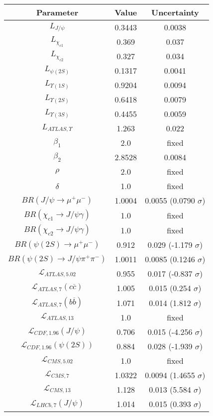 \begin{table}[h!]
\centering
\begin{tabular}{c|c|c}
Parameter & Value & Uncertainty \\
\hline
$L_{J/\psi}$ & 0.3443 & 0.0038 \\
$L_{\chi_{c1}}$ & 0.369 & 0.037 \\
$L_{\chi_{c2}}$ & 0.327 & 0.034 \\
$L_{\psi(2S)}$ & 0.1317 & 0.0041 \\
$L_{\Upsilon(1S)}$ & 0.9204 & 0.0094 \\
$L_{\Upsilon(2S)}$ & 0.6418 & 0.0079 \\
$L_{\Upsilon(3S)}$ & 0.4455 & 0.0059 \\
$L_{ATLAS,\Upsilon}$ & 1.263 & 0.022 \\
$\beta_1$ & 2.0 & fixed \\
$\beta_2$ & 2.8528 & 0.0084 \\
$\rho$ & 2.0 & fixed \\
$\delta$ & 1.0 & fixed \\
$BR(J/\psi\rightarrow\mu^+\mu^-)$ & 1.0004 & 0.0055 (0.0790 $\sigma$) \\
$BR(\chi_{c1}\rightarrow J/\psi\gamma)$ & 1.0 & fixed \\
$BR(\chi_{c2}\rightarrow J/\psi\gamma)$ & 1.0 & fixed \\
$BR(\psi(2S)\rightarrow\mu^+\mu^-)$ & 0.912 & 0.029 (-1.179 $\sigma$) \\
$BR(\psi(2S)\rightarrow J/\psi\pi^+\pi^-)$ & 1.0011 & 0.0085 (0.1246 $\sigma$) \\
$\mathcal L_{ATLAS,5.02}$ & 0.955 & 0.017 (-0.837 $\sigma$) \\
$\mathcal L_{ATLAS,7}(c\overline c)$ & 1.005 & 0.015 (0.254 $\sigma$) \\
$\mathcal L_{ATLAS,7}(b\overline b)$ & 1.071 & 0.014 (1.812 $\sigma$) \\
$\mathcal L_{ATLAS,13}$ & 1.0 & fixed \\
$\mathcal L_{CDF,1.96}(J/\psi)$ & 0.706 & 0.015 (-4.256 $\sigma$) \\
$\mathcal L_{CDF,1.96}(\psi(2S))$ & 0.884 & 0.028 (-1.939 $\sigma$) \\
$\mathcal L_{CMS,5.02}$ & 1.0 & fixed \\
$\mathcal L_{CMS,7}$ & 1.0322 & 0.0094 (1.4655 $\sigma$) \\
$\mathcal L_{CMS,13}$ & 1.128 & 0.013 (5.584 $\sigma$) \\
$\mathcal L_{LHCb,7}(J/\psi)$ & 1.014 & 0.015 (0.393 $\sigma$) \\

\end{tabular}
\end{table}
